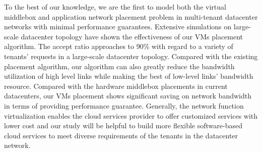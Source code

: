 \documentclass[review]{elsarticle}
\begin{document}


To the best of our knowledge, we are the first to model both the  virtual middlebox and application network placement problem in multi-tenant datacenter networks with minimal performance guarantees. Extensive simulations on large-scale datacenter topology have shown the effectiveness of our VMs placement algorithm. The accept ratio approaches to 90\% with regard to a variety of tenants' requests in a large-scale datacenter topology. Compared with the existing placement algorithm, our algorithm can also greatly reduce the bandwidth utilization of high level links while making the best of low-level links' bandwidth resource. %
Compared with the hardware middlebox placements in current datacenters, our VMs placement shows significant saving on network bandwidth in terms of providing  performance guarantee. Generally, the network function virtualization enables the cloud services provider to offer customized services with lower cost and our study will be helpful to build more flexible software-based cloud services to meet diverse requirements of  the tenants in the datacenter network.

\end{document}
